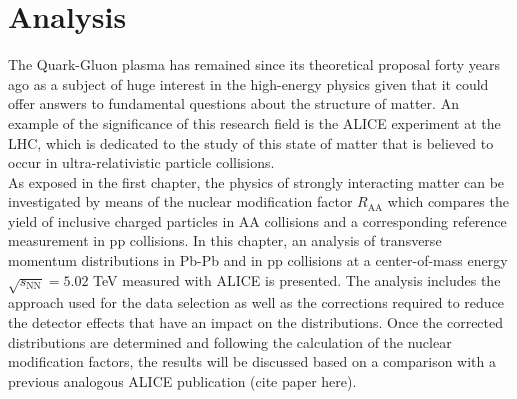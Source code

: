 \documentclass[12pt,a4paper]{report}
\begin{document}
\chapter{Analysis}
The Quark-Gluon plasma has remained since its theoretical proposal forty years ago as a subject of huge interest in the high-energy physics given that it could offer answers to fundamental questions about the structure of matter. An example of the significance of this research field is the ALICE experiment at the LHC, which is dedicated to the study of this state of matter that is believed to occur in ultra-relativistic particle collisions. \\
As exposed in the first chapter, the physics of strongly interacting matter can be investigated by means of the nuclear modification factor $R_\text{AA}$ which compares the yield of inclusive charged particles in AA collisions and a corresponding reference measurement in pp collisions. In this chapter, an analysis of transverse momentum distributions in Pb-Pb and in pp collisions at a center-of-mass energy $\sqrt{s_\text{NN}}= 5.02$ TeV measured with ALICE is presented. The analysis includes the approach used for the data selection as well as the corrections required to reduce the detector effects that have an impact on the \pt distributions. Once the corrected \pt distributions are determined and following the calculation of the nuclear modification factors, the results will be discussed based on a comparison with a previous analogous ALICE publication (cite paper here).
\end{document}
